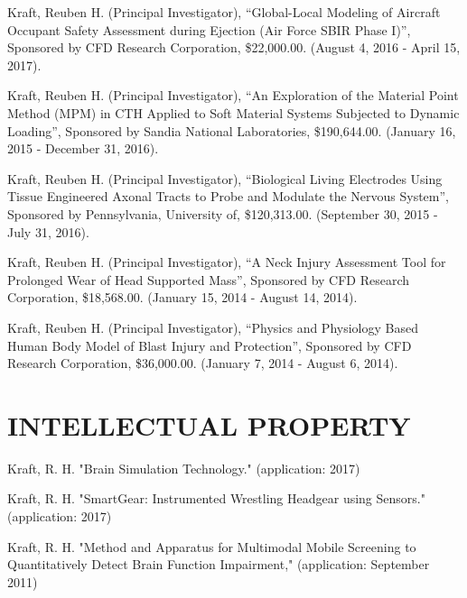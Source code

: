 \documentclass[a4paper,10pt]{article}
\begin{document}
        \noindent Kraft, Reuben H. (Principal Investigator), ``Global-Local Modeling of Aircraft Occupant Safety Assessment during Ejection (Air Force SBIR Phase I)'', Sponsored by CFD Research Corporation, \$22,000.00. (August 4, 2016 - April 15, 2017).\vspace{0.25cm}
        
        \noindent Kraft, Reuben H. (Principal Investigator), ``An Exploration of the Material Point Method (MPM) in CTH Applied to Soft Material Systems Subjected to Dynamic Loading'', Sponsored by Sandia National Laboratories, \$190,644.00. (January 16, 2015 - December 31, 2016).\vspace{0.25cm}
        
        \noindent Kraft, Reuben H. (Principal Investigator), ``Biological Living Electrodes Using Tissue Engineered Axonal Tracts to Probe and Modulate the Nervous System'', Sponsored by Pennsylvania, University of, \$120,313.00. (September 30, 2015 - July 31, 2016).\vspace{0.25cm}
        
        \noindent Kraft, Reuben H. (Principal Investigator), ``A Neck Injury Assessment Tool for Prolonged Wear of Head Supported Mass'', Sponsored by CFD Research Corporation, \$18,568.00. (January 15, 2014 - August 14, 2014).\vspace{0.25cm}
        
        \noindent Kraft, Reuben H. (Principal Investigator), ``Physics and Physiology Based Human Body Model of Blast Injury and Protection'', Sponsored by CFD Research Corporation, \$36,000.00. (January 7, 2014 - August 6, 2014).\vspace{0.25cm}
        

    \section*{INTELLECTUAL PROPERTY}
    
        \noindent Kraft, R. H. "Brain Simulation Technology."  (application: 2017)\vspace{0.25cm}
        
        \noindent Kraft, R. H. "SmartGear:    Instrumented Wrestling Headgear using Sensors."  (application: 2017)\vspace{0.25cm}
        
        \noindent Kraft, R. H. "Method and Apparatus for Multimodal Mobile Screening to Quantitatively Detect Brain Function Impairment,"  (application: September 2011)\vspace{0.25cm}
        
\end{document}
